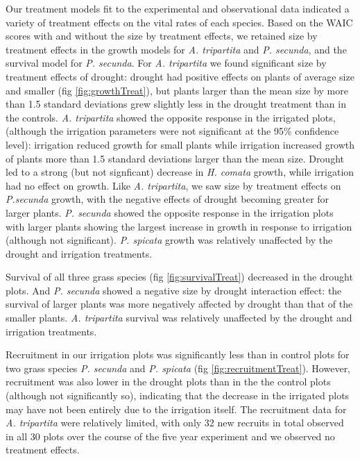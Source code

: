 \documentclass[11pt]{article}
\begin{document}
\begin{doublespace}
Our treatment models fit to the experimental and observational data indicated a variety of treatment effects on the vital rates of each species. Based on the WAIC scores with and without the size by treatment effects, we retained size by treatment effects in the growth models for \textit{A. tripartita} and \textit{P. secunda}, and the survival model for \textit{P. secunda}. For \textit{A. tripartita} we found significant size by treatment effects of drought: drought had positive effects on plants of average size and smaller (fig \ref{fig:growthTreat}), but plants larger than the mean size by more than 1.5 standard deviations grew slightly less in the drought treatment than in the controls. \textit{A. tripartita} showed the opposite response in the irrigated plots, (although the irrigation parameters were not significant at the 95\% confidence level): irrigation reduced growth for small plants while irrigation increased growth of plants more than 1.5 standard deviations larger than the mean size. Drought led to a strong (but not signficant) decrease in \textit{H. comata} growth, while irrigation had no effect on growth.  Like \textit{A. tripartita}, we saw size by treatment effects on \textit{P.secunda} growth, with the negative effects of drought becoming greater for larger plants. \textit{P. secunda} showed the opposite response in the irrigation plots with larger plants showing the largest increase in growth in response to irrigation (although not significant). \textit{P. spicata} growth was relatively unaffected by the drought and irrigation treatments. 

Survival of all three grass species (fig \ref{fig:survivalTreat}) decreased in the drought plots. And \textit{P. secunda} showed a negative size by drought interaction effect: the survival of larger plants was more negatively affected by drought than that of the smaller plants. \textit{A. tripartita} survival was relatively unaffected by the drought and irrigation treatments.

Recruitment in our irrigation plots was significantly less than in control plots for two grass species \textit{P. secunda} and \textit{P. spicata} (fig \ref{fig:recruitmentTreat}). However, recruitment was also lower in the drought plots than in the the control plots (although not significantly so), indicating that the decrease in the irrigated plots may have not been entirely due to the irrigation itself. The recruitment data for \textit{A. tripartita} were relatively limited, with only 32 new recruits in total observed in all 30 plots over the course of the five year experiment and we observed no treatment effects.


\end{doublespace}
\end{document}
